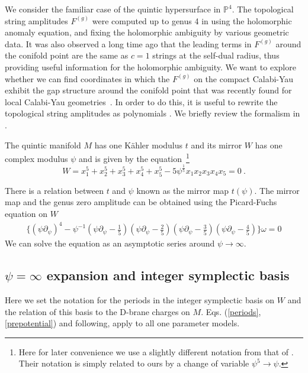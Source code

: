 \documentclass[12pt]{article}
\begin{document}
We consider the familiar case of the quintic hypersurface in
$\mathbb{P}^4$. The topological string amplitudes $F^{(g)}$ were
computed up to genus 4 in \cite{BCOV, Katz:1999} using the
holomorphic anomaly equation, and fixing the holomorphic ambiguity
by various geometric data. It was also observed a long time ago
\cite{Ghoshal:1995} that the leading terms in $F^{(g)}$ around the
conifold point are the same as $c=1$ strings at the self-dual radius,
thus providing useful information for the holomorphic ambiguity. We
want to explore whether we can find coordinates in which 
the $F^{(g)}$ on the compact Calabi-Yau exhibit the gap structure 
around the conifold point that was recently found for local 
Calabi-Yau geometries~\cite{Huang}. In order to do this, it is useful to 
rewrite the topological string amplitudes
as polynomials \cite{Yamaguchi}. We briefly review the formalism
in \cite{Yamaguchi}.

The quintic manifold $M$ has one K\"ahler modulus $t$ and its mirror
$W$ has one complex modulus $\psi$ and is given by the 
equation~\footnote{Here for later convenience we use a slightly 
different notation from that of
\cite{Yamaguchi}. Their notation is simply related to ours by a
change of variable $\psi^5\rightarrow \psi$.}
\begin{equation}
W=x_1^5+x_2^5+x_3^5+x_4^5+ x_5^5-5\psi^\frac{1}{5}x_1x_2x_3x_4x_5=0\ .
\label{quintic} 
\end{equation} 

There is a relation between $t$ and $\psi$ known as the mirror 
map $t(\psi)$. The mirror map and the genus zero amplitude 
can be obtained using the Picard-Fuchs equation on $W$
\begin{eqnarray}
\{(\psi\partial_{\psi})^4-\psi^{-1}(\psi\partial_{\psi}-\frac{1}{5})
(\psi\partial_{\psi}-\frac{2}{5})(\psi\partial_{\psi}-\frac{3}{5})(\psi\partial_{\psi}-\frac{4}{5})\}\omega=0
\label{differentialoperator}
\end{eqnarray}
We can solve the equation as an asymptotic series around
$\psi\rightarrow \infty$.
\subsection{$\psi=\infty$ expansion and integer symplectic basis}
\label{integralsymplecticbasis}
Here we set the notation for the periods in the integer 
symplectic basis on $W$  and the relation of this basis to the 
D-brane charges on $M$. Eqs. (\ref{periods},\ref{prepotential}) and 
following, apply to all one parameter models.
 
\end{document}
